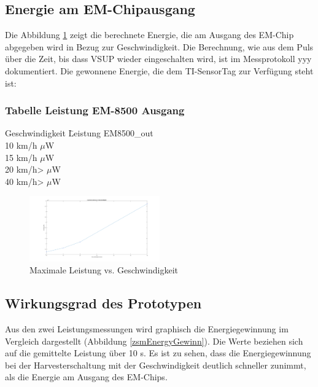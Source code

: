 \subsection{Energie am EM-Chipausgang}

Die Abbildung \ref{energie_resultat_harvester} zeigt die berechnete Energie, die am Ausgang des EM-Chip abgegeben wird in Bezug zur Geschwindigkeit. Die Berechnung, wie aus dem Puls über die Zeit, bis dass VSUP wieder eingeschalten wird, ist im  Messprotokoll yyy dokumentiert. Die gewonnene Energie, die dem TI-SensorTag zur Verfügung steht ist:

\subsubsection*{Tabelle Leistung EM-8500 Ausgang}
\label{res_em_aus}
\begin{tabbing}
    Geschwindigkeit \quad\= Leistung EM8500\_out \\[0.8ex]
    10 km/h     $\mu$W\\
    15 km/h    $\mu$W\\
    20 km/h>   $\mu$W\\
    40 km/h>  $\mu$W\\
\end{tabbing}  


\begin{figure}[ht]
    \includegraphics[width=0.5\textwidth]{4Resultate/imag/ResultatLeistungGeschwindigkeit.png} 
    \caption{Maximale Leistung vs. Geschwindigkeit}
    \label{energie_resultat_harvester}
\end{figure}

\subsection{Wirkungsgrad des Prototypen}

Aus den zwei Leistungsmessungen wird graphisch die Energiegewinnung im Vergleich dargestellt (Abbildung \ref{zsmEnergyGewinn}). Die Werte beziehen sich auf die gemittelte Leistung über 10 s. Es ist zu sehen, dass die Energiegewinnung bei der Harvesterschaltung mit der Geschwindigkeit deutlich schneller zunimmt, als die Energie am Ausgang des EM-Chips. 

